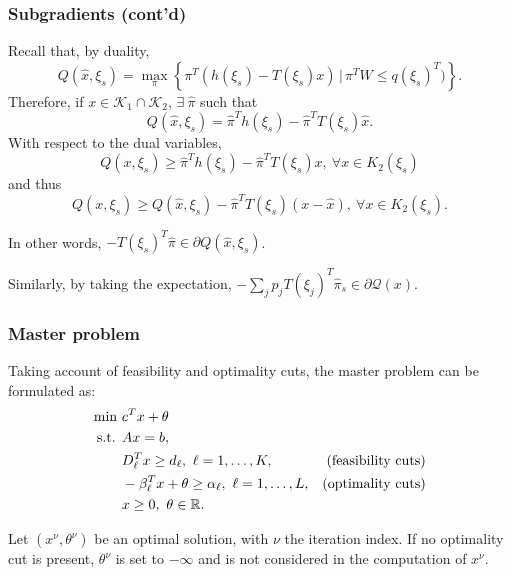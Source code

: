 \documentclass{beamer}
\def\cK{\mathcal{K}}
\begin{document}
\begin{frame}
\frametitle{Subgradients (cont'd)}

Recall that, by duality,
\[
Q(\hat{x}, \xi_s) =
\max_{\pi} \left\lbrace \pi^T(h(\xi_s)-T(\xi_s)x) \,|\, \pi^TW \leq q(\xi_s)^T) \right\rbrace.
\]
Therefore, if $x \in \cK_1 \cap \cK_2$, $\exists\ \hat{\pi}$ such that
\[
Q(\hat{x}, \xi_s) = \hat{\pi}^Th(\xi_s)-\hat{\pi}^TT(\xi_s)\hat{x}.
\]
With respect to the dual variables,
\[
Q(x, \xi_s) \geq \hat{\pi}^Th(\xi_s)-\hat{\pi}^TT(\xi_s) x,
\ \forall x \in K_2(\xi_s)
\]
and thus
\[
Q(x, \xi_s) \geq Q({\hat{x}, \xi_s}) - \hat{\pi}^TT(\xi_s) (x-\hat{x}),
\ \forall x \in K_2(\xi_s).
\]
	
In other words, $-T(\xi_s)^T\hat{\pi} \in \partial Q(\hat{x}, \xi_s)$.
	
\mbox{}
	
Similarly, by taking the expectation, $- \sum_j p_j T(\xi_j)^T\hat{\pi}_s \in \partial \mathcal{Q}(x)$.
	
\end{frame}

\begin{frame}
\frametitle{Master problem}

Taking account of feasibility and optimality cuts, the master problem can be formulated as:
\begin{align*}
\min\ & c^Tx + \theta \\
\mbox{s.t. } & Ax = b, \\
& D_{\ell}^Tx \geq d_{\ell},\ \ell = 1,\ldots,K, & \mbox{(feasibility cuts)} \\
& -\beta_{\ell}^Tx + \theta \geq \alpha_{\ell},\ \ell = 1,\ldots,L, & \mbox{(optimality cuts)}\\
& x \geq 0,\ \theta \in \mathbb{R}.
\end{align*}
	
\mbox{}

Let $(x^{\nu}, \theta^{\nu})$ be an optimal solution, with $\nu$ the iteration index.
If no optimality cut is present, $\theta^{\nu}$ is set to $-\infty$ and is not considered in the computation of $x^{\nu}$.

\end{frame}
\end{document}
